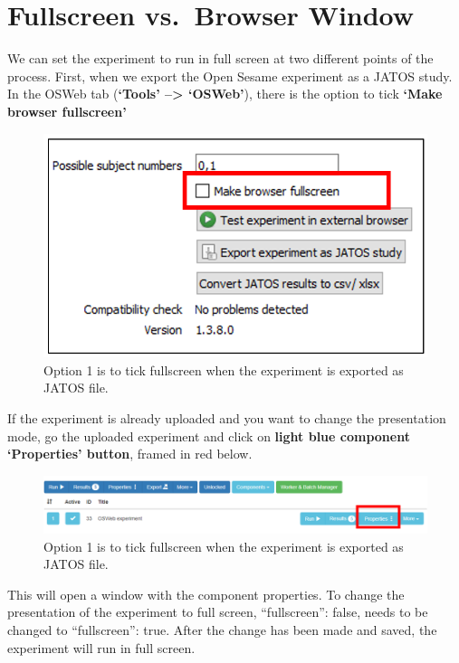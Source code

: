 \documentclass[
]{book}
\begin{document}
\hypertarget{fullscreen-vs.-browser-window}{%
\section{Fullscreen vs.~Browser Window}\label{fullscreen-vs.-browser-window}}

We can set the experiment to run in full screen at two different points of the process. First, when we export the Open Sesame experiment as a JATOS study. In the OSWeb tab (\textbf{`Tools' --\textgreater{} `OSWeb'}), there is the option to tick \textbf{`Make browser fullscreen'}

\begin{figure}

{\centering \includegraphics[width=0.5\linewidth]{images/opensesame/fullscreen1} 

}

\caption{Option 1 is to tick fullscreen when the experiment is exported as JATOS file.}\label{fig:Figure13-1}
\end{figure}

If the experiment is already uploaded and you want to change the presentation mode, go the uploaded experiment and click on \textbf{light blue component `Properties' button}, framed in red below.

\begin{figure}

{\centering \includegraphics[width=0.99\linewidth]{images/opensesame/componentproperty} 

}

\caption{Option 1 is to tick fullscreen when the experiment is exported as JATOS file.}\label{fig:Figure13-2}
\end{figure}

This will open a window with the component properties. To change the presentation of the experiment to full screen, ``fullscreen'': false, needs to be changed to ``fullscreen'': true. After the change has been made and saved, the experiment will run in full screen.
\end{document}
